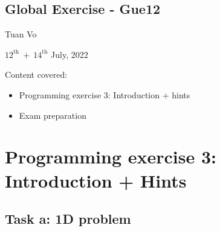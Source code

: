 \documentclass[12pt]{article}
\begin{document}
\begin{center}
	\section*{Global Exercise - Gue12}
\end{center}
\begin{center}
	Tuan Vo
\end{center}
\begin{center}
	$12^{\text{th}} \ + \ 14^{\text{th}}$ July, 2022
\end{center}
Content covered:
\begin{itemize}
	\item[\checkmark] Programming exercise 3: Introduction + hints
	\item[\checkmark] Exam preparation
\end{itemize}

\section{Programming exercise 3: Introduction + Hints}
\subsection{Task a: 1D problem}
\end{document}

